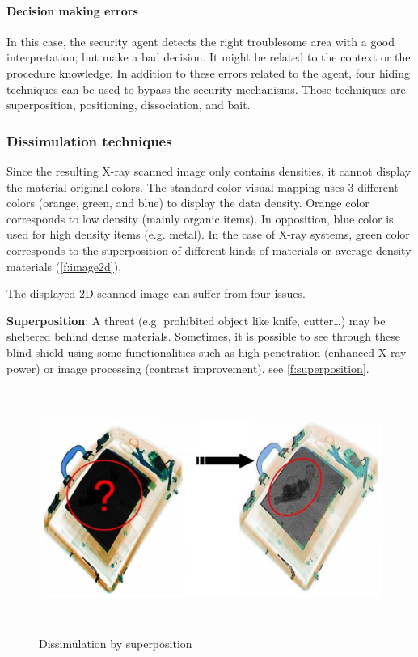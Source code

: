 \paragraph{Decision making errors}
In this case, the security agent detects the right troublesome area with a good interpretation, but make a bad decision. It might be related to the context or the procedure knowledge.
In addition to these errors related to the agent, four hiding techniques can be used to bypass the security mechanisms. Those techniques are superposition, positioning, dissociation, and bait.

\subsubsection{ Dissimulation techniques }
Since the resulting X-ray scanned image only contains densities, it cannot display the material original colors. The standard color visual mapping uses 3 different colors (orange, green, and blue) to display the data density. Orange color corresponds to low density (mainly organic items). In opposition, blue color is used for high density items (e.g. metal). In the case of X-ray systems, green color corresponds to the superposition of different kinds of materials or average density materials (\autoref{f:image2d}). 

The displayed 2D scanned image can suffer from four issues.

\textbf{Superposition}: A threat (e.g. prohibited object like knife, cutter…) may be sheltered behind dense materials. Sometimes, it is possible to see through these blind shield using some functionalities such as high penetration (enhanced X-ray power) or image processing (contrast improvement),  see  \autoref{f:superposition}. 
\begin{figure}
\centering
	\includegraphics[height=8cm]{Figures/superposition}
	\caption{Dissimulation by superposition}
	\label{f:superposition}
\end{figure}

